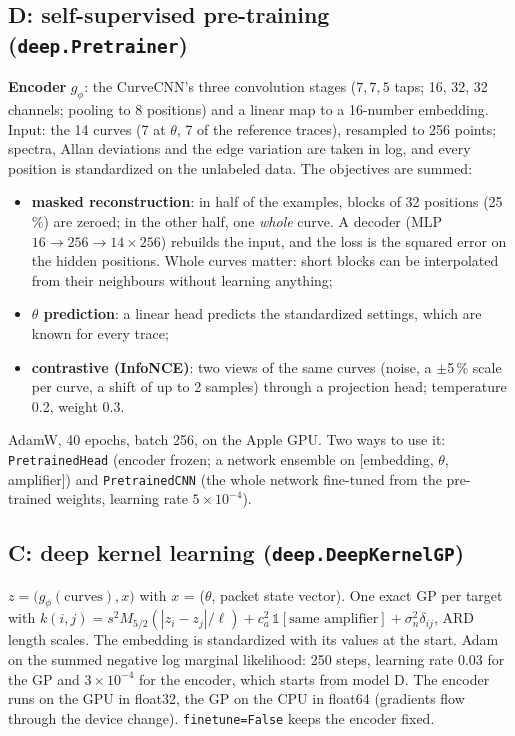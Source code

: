 \documentclass[10pt]{article}
\newcommand{\code}[1]{\texttt{#1}}
\begin{document}
\subsection{D: self-supervised pre-training (\code{deep.Pretrainer})}
\begin{advanced}
\textbf{Encoder} $g_\phi$: the CurveCNN's three convolution stages ($7, 7, 5$ taps; 16, 32, 32 channels; pooling to 8 positions) and a
linear map to a 16-number embedding. Input: the 14 curves (7 at $\theta$, 7 of the reference traces), resampled to 256 points;
spectra, Allan deviations and the edge variation are taken in log, and every position is standardized on the unlabeled data. The
objectives are summed:
\begin{itemize}
\item \textbf{masked reconstruction}: in half of the examples, blocks of 32 positions (25\,\%) are zeroed; in the other half, one
  \emph{whole} curve. A decoder (MLP $16 \to 256 \to 14 \times 256$) rebuilds the input, and the loss is the squared error on the hidden
  positions. Whole curves matter: short blocks can be interpolated from their neighbours without learning anything;
\item \textbf{$\theta$ prediction}: a linear head predicts the standardized settings, which are known for every trace;
\item \textbf{contrastive (InfoNCE)}: two views of the same curves (noise, a $\pm$5\,\% scale per curve, a shift of up to 2 samples) through a
  projection head; temperature 0.2, weight 0.3.
\end{itemize}
AdamW, 40 epochs, batch 256, on the Apple GPU. Two ways to use it: \code{PretrainedHead} (encoder frozen; a network ensemble on
[embedding, $\theta$, amplifier]) and \code{PretrainedCNN} (the whole network fine-tuned from the pre-trained weights, learning rate
$5\times10^{-4}$).
\end{advanced}

\subsection{C: deep kernel learning (\code{deep.DeepKernelGP})}
\begin{advanced}
$z = \bigl(g_\phi(\text{curves}), x\bigr)$ with $x$ = ($\theta$, packet state vector). One exact GP per target with
$k(i,j) = s^2 M_{5/2}(|z_i - z_j|/\ell) + c_a^2\,\mathbb{1}[\text{same amplifier}] + \sigma_n^2\delta_{ij}$, ARD length scales. The
embedding is standardized with its values at the start. Adam on the summed negative log marginal likelihood: 250 steps, learning rate
0.03 for the GP and $3\times10^{-4}$ for the encoder, which starts from model D. The encoder runs on the GPU in float32, the GP on the
CPU in float64 (gradients flow through the device change). \code{finetune=False} keeps the encoder fixed.
\end{advanced}
\end{document}
